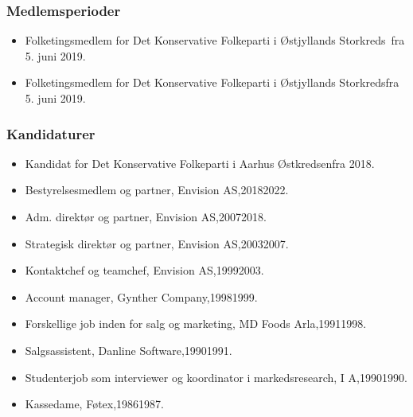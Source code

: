 \documentclass[11pt, a4paper]{awesome-cv}
\begin{document}
\begin{cvletter}
\subsubsection*{Medlemsperioder}
\begin{itemize}
\item Folketingsmedlem for Det Konservative Folkeparti i Østjyllands Storkreds fra 5. juni 2019.
\item Folketingsmedlem for Det Konservative Folkeparti i Østjyllands Storkredsfra 5. juni 2019.
\end{itemize}
\subsubsection*{Kandidaturer}
\begin{itemize}
\item Kandidat for Det Konservative Folkeparti i Aarhus Østkredsenfra 2018.
\end{itemize}
\begin{itemize}
\item Bestyrelsesmedlem og partner, Envision AS,20182022.
\item Adm. direktør og partner, Envision AS,20072018.
\item Strategisk direktør og partner, Envision AS,20032007.
\item Kontaktchef og teamchef, Envision AS,19992003.
\item Account manager, Gynther  Company,19981999.
\item Forskellige job inden for salg og marketing, MD Foods Arla,19911998.
\item Salgsassistent, Danline Software,19901991.
\item Studenterjob som interviewer og koordinator i markedsresearch, I  A,19901990.
\item Kassedame, Føtex,19861987.
\end{itemize}
\end{cvletter}
\end{document}
